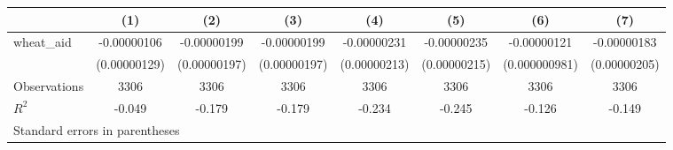 \begin{tabular}{l*{7}{c}}
\toprule
                &\multicolumn{1}{c}{(1)}&\multicolumn{1}{c}{(2)}&\multicolumn{1}{c}{(3)}&\multicolumn{1}{c}{(4)}&\multicolumn{1}{c}{(5)}&\multicolumn{1}{c}{(6)}&\multicolumn{1}{c}{(7)}\\
\midrule
wheat\_aid       &-0.00000106&-0.00000199&-0.00000199&-0.00000231&-0.00000235&-0.00000121&-0.00000183\\
                &(0.00000129)&(0.00000197)&(0.00000197)&(0.00000213)&(0.00000215)&(0.000000981)&(0.00000205)\\
\midrule
Observations    &     3306&     3306&     3306&     3306&     3306&     3306&     3306\\
\(R^{2}\)       &   -0.049&   -0.179&   -0.179&   -0.234&   -0.245&   -0.126&   -0.149\\
\bottomrule
\multicolumn{8}{l}{\footnotesize Standard errors in parentheses}\\
\end{tabular}
